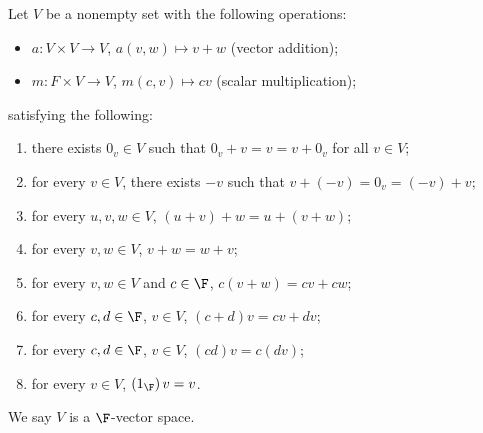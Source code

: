 \documentclass[12pt]{mypackage}
\begin{document}
\begin{definition}
  Let $V$ be a nonempty set with the following operations:
  \begin{itemize}
    \item $a: V\times V \rightarrow V$, $a(v,w)\mapsto v+w$ (vector addition);
    \item $m: F\times V \rightarrow V$, $m(c,v) \mapsto cv$ (scalar multiplication);
  \end{itemize}
  satisfying the following:
  \begin{enumerate}[(1)]
    \item there exists $0_v\in V$ such that $0_v + v = v = v + 0_v$ for all $v\in V$;
    \item for every $v\in V$, there exists $-v$ such that $v + (-v) = 0_v = (-v) + v$;
    \item for every $u,v,w\in V$, $(u+v) + w = u + (v+w)$;
    \item for every $v,w\in V$, $v+w = w+v$;
    \item for every $v,w\in V$ and $c\in \F$, $c(v+w) = cv + cw$;
    \item for every $c,d\in \F$, $v\in V$, $(c+d)v = cv + dv$;
    \item for every $c,d\in \F$, $v\in V$, $(cd)v = c(dv)$;
    \item for every $v\in V$, $\left(1_{\F}\right)v = v$.
  \end{enumerate}
  We say $V$ is a $\F$-vector space.
\end{definition}
\end{document}
